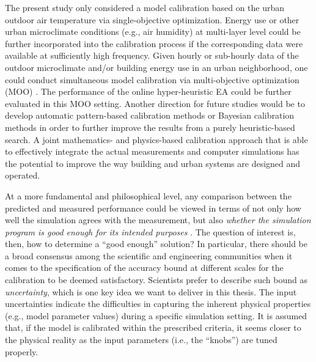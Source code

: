 The present study only considered a model calibration based on the urban outdoor air temperature via single-objective optimization. Energy use or other urban microclimate conditions (e.g., air humidity) at multi-layer level could be further incorporated into the calibration process if the corresponding data were available at sufficiently high frequency. Given hourly or sub-hourly data of the outdoor microclimate and/or building energy use in an urban neighborhood, one could conduct simultaneous model calibration via multi-objective optimization (MOO) \cite{santos2018evaluating}. The performance of the online hyper-heuristic EA could be further evaluated in this MOO setting. Another direction for future studies would be to develop automatic pattern-based calibration methods \cite{sun2016pattern} or Bayesian calibration methods \cite{heo2012calibration} in order to further improve the results from a purely heuristic-based search. A joint mathematics- and physics-based calibration approach that is able to effectively integrate the actual measurements and computer simulations has the potential to improve the way building and urban systems are designed and operated.

At a more fundamental and philosophical level, any comparison between the predicted and measured performance could be viewed in terms of not only how well the simulation agrees with the measurement, but also \textit{whether the simulation program is good enough for its intended purposes} \cite{reddy2007calibrating}. The question of interest is, then, how to determine a ``good enough'' solution? In particular, there should be a broad consensus among the scientific and engineering communities when it comes to the specification of the accuracy bound at different scales for the calibration to be deemed satisfactory. Scientists prefer to describe such bound as \textit{uncertainty}, which is one key idea we want to deliver in this thesis. The input uncertainties indicate the difficulties in capturing the inherent physical properties (e.g., model parameter values) during a specific simulation setting. It is assumed that, if the model is calibrated within the prescribed criteria, it seems closer to the physical reality as the input parameters (i.e., the ``knobs'') are tuned properly.


